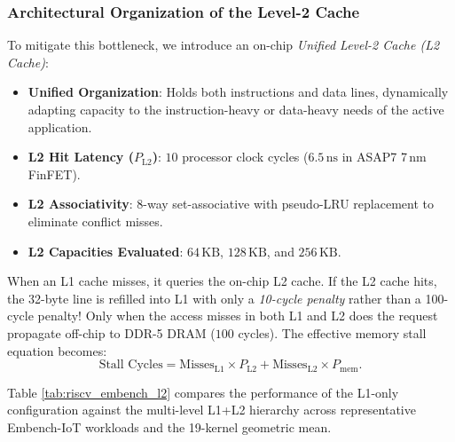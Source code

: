\subsubsection{Architectural Organization of the Level-2 Cache}
To mitigate this bottleneck, we introduce an on-chip \textit{Unified Level-2 Cache (L2 Cache)}:
\begin{itemize}
    \item \textbf{Unified Organization}: Holds both instructions and data lines, dynamically adapting capacity to the instruction-heavy or data-heavy needs of the active application.
    \item \textbf{L2 Hit Latency ($P_{\text{L2}}$)}: $10$ processor clock cycles ($6.5\,\text{ns}$ in ASAP7 7\,nm FinFET).
    \item \textbf{L2 Associativity}: 8-way set-associative with pseudo-LRU replacement to eliminate conflict misses.
    \item \textbf{L2 Capacities Evaluated}: $64\,\text{KB}$, $128\,\text{KB}$, and $256\,\text{KB}$.
\end{itemize}

When an L1 cache misses, it queries the on-chip L2 cache. If the L2 cache hits, the 32-byte line is refilled into L1 with only a \textit{10-cycle penalty} rather than a 100-cycle penalty! Only when the access misses in both L1 and L2 does the request propagate off-chip to DDR-5 DRAM ($100$ cycles). The effective memory stall equation becomes:
\begin{equation}
\text{Stall Cycles} = \text{Misses}_{\text{L1}} \times P_{\text{L2}} + \text{Misses}_{\text{L2}} \times P_{\text{mem}}.
\end{equation}

Table \ref{tab:riscv_embench_l2} compares the performance of the L1-only configuration against the multi-level L1+L2 hierarchy across representative Embench-IoT workloads and the 19-kernel geometric mean.


